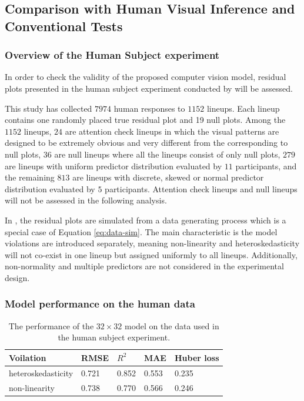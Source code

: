 \documentclass[]{interact}
\theoremstyle{plain}%
\theoremstyle{definition}
\theoremstyle{remark}
\begin{document}
\subsection{Comparison with Human Visual Inference and Conventional
Tests}\label{comparison-with-human-visual-inference-and-conventional-tests}

\subsubsection{Overview of the Human Subject
experiment}\label{overview-of-the-human-subject-experiment}

In order to check the validity of the proposed computer vision model,
residual plots presented in the human subject experiment conducted by
\citet{li2023plot} will be assessed.

This study has collected \(7974\) human responses to \(1152\) lineups.
Each lineup contains one randomly placed true residual plot and 19 null
plots. Among the \(1152\) lineups, \(24\) are attention check lineups in
which the visual patterns are designed to be extremely obvious and very
different from the corresponding to null plots, \(36\) are null lineups
where all the lineups consist of only null plots, \(279\) are lineups
with uniform predictor distribution evaluated by \(11\) participants,
and the remaining \(813\) are lineups with discrete, skewed or normal
predictor distribution evaluated by \(5\) participants. Attention check
lineups and null lineups will not be assessed in the following analysis.

In \citet{li2023plot}, the residual plots are simulated from a data
generating process which is a special case of Equation
\ref{eq:data-sim}. The main characteristic is the model violations are
introduced separately, meaning non-linearity and heteroskedasticity will
not co-exist in one lineup but assigned uniformly to all lineups.
Additionally, non-normality and multiple predictors are not considered
in the experimental design.

\subsubsection{Model performance on the human
data}\label{model-performance-on-the-human-data}

\begin{table}

\caption{\label{tab:experiment-performance}The performance of the $32 \times 32$ model on the data used in the human subject experiment.}
\centering
\begin{tabular}[t]{lllll}
\toprule
Voilation & RMSE & $R^2$ & MAE & Huber loss\\
\midrule
heteroskedasticity & 0.721 & 0.852 & 0.553 & 0.235\\
non-linearity & 0.738 & 0.770 & 0.566 & 0.246\\
\bottomrule
\end{tabular}
\end{table}
\end{document}
